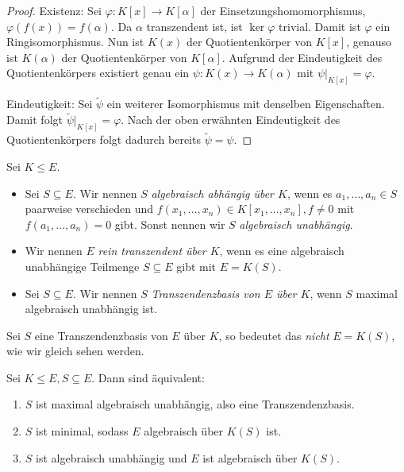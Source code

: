 \begin{proof}
    Existenz: Sei $\varphi : K[x] \to K[\alpha]$ der Einsetzungshomomorphismus, $\varphi(f(x)) = f(\alpha)$. Da $\alpha$ transzendent ist, ist $\ker \varphi$ trivial. Damit ist $\varphi$ ein Ringisomorphismus. Nun ist $K(x)$ der Quotientenkörper von $K[x]$, genauso ist $K(\alpha)$ der Quotientenkörper von $K[\alpha]$. Aufgrund der Eindeutigkeit des Quotientenkörpers existiert genau ein $\psi : K(x) \to K(\alpha)$ mit $\psi\vert_{K[x]} = \varphi$.

    Eindeutigkeit: Sei $\widetilde{\psi}$ ein weiterer Isomorphismus mit denselben Eigenschaften. Damit folgt $\widetilde{\psi}\vert_{K[x]} = \varphi$. Nach der oben erwähnten Eindeutigkeit des Quotientenkörpers folgt dadurch bereits $\widetilde{\psi} = \psi$.
\end{proof}


\begin{definition}
    Sei $K \leq E$.
    \begin{itemize}
        \item Sei $S \subseteq E$. Wir nennen $S$ \emph{algebraisch abhängig über $K$}, wenn es $a_1,\hdots,a_n\in S$ paarweise verschieden und $ f(x_1, \hdots, x_n) \in K[x_1, \hdots, x_n], f \neq 0$ mit $f(a_1,\hdots,a_n)=0$ gibt.
        Sonst nennen wir $S$ \emph{algebraisch unabhängig}.
        \item Wir nennen $E$ \emph{rein transzendent über $K$}, wenn es eine algebraisch unabhängige Teilmenge $S \subseteq E$ gibt mit $E = K(S)$.
        \item Sei $S \subseteq E$. Wir nennen $S$ \emph{Transzendenzbasis von $E$ über $K$}, wenn $S$ maximal algebraisch unabhängig ist.
    \end{itemize}
\end{definition}

\begin{remark}
    Sei $S$ eine Transzendenzbasis von $E$ über $K$, so bedeutet das \emph{nicht} $E = K(S)$, wie wir gleich sehen werden.
\end{remark}

\begin{proposition}
    Sei $K \leq E, S \subseteq E$. Dann sind äquivalent:
    \begin{enumerate}
        \item $S$ ist maximal algebraisch unabhängig, also eine Transzendenzbasis.
        \item $S$ ist minimal, sodass $E$ algebraisch über $K(S)$ ist.
        \item $S$ ist algebraisch unabhängig und $E$ ist algebraisch über $K(S)$.
    \end{enumerate}
\end{proposition}

